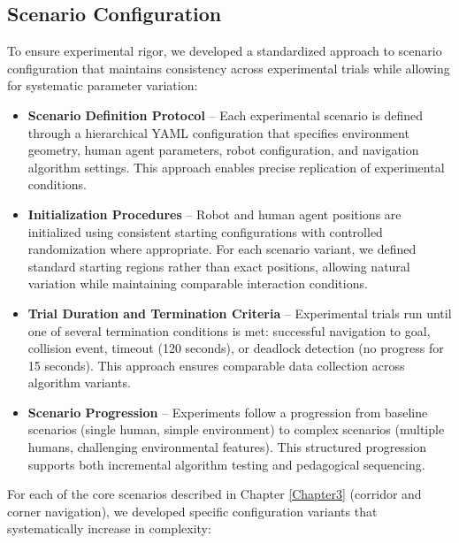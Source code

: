 \subsection{Scenario Configuration}
\label{subsec:scenario_configuration}
To ensure experimental rigor, we developed a standardized approach to scenario 
configuration that maintains consistency across experimental trials while allowing 
for systematic parameter variation:
\begin{itemize}
    \item \textbf{Scenario Definition Protocol} -- Each experimental scenario is 
    defined through a hierarchical YAML configuration that specifies environment 
    geometry, human agent parameters, robot configuration, and navigation algorithm 
    settings. This approach enables precise replication of experimental conditions.
    \item \textbf{Initialization Procedures} -- Robot and human agent positions are 
    initialized using consistent starting configurations with controlled randomization 
    where appropriate. For each scenario variant, we defined standard starting regions 
    rather than exact positions, allowing natural variation while maintaining comparable 
    interaction conditions.
    \item \textbf{Trial Duration and Termination Criteria} -- Experimental trials run 
    until one of several termination conditions is met: successful navigation to goal, 
    collision event, timeout (120 seconds), or deadlock detection (no progress for 15 seconds). 
    This approach ensures comparable data collection across algorithm variants.
    \item \textbf{Scenario Progression} -- Experiments follow a progression from baseline 
    scenarios (single human, simple environment) to complex scenarios (multiple humans, 
    challenging environmental features). This structured progression supports both 
    incremental algorithm testing and pedagogical sequencing.
\end{itemize}
For each of the core scenarios described in Chapter \ref{Chapter3} (corridor and 
corner navigation), we developed specific configuration variants that 
systematically increase in complexity:

